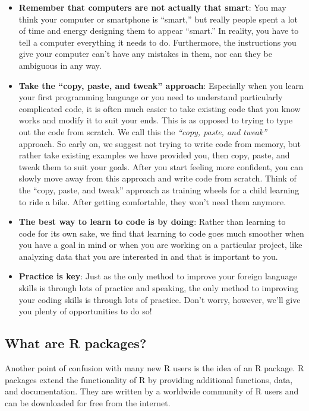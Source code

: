 \documentclass[
]{article}
\providecommand{\tightlist}{%
  \setlength{\itemsep}{0pt}\setlength{\parskip}{0pt}}
\begin{document}
\begin{itemize}
\tightlist
\item
  \textbf{Remember that computers are not actually that smart}: You may
  think your computer or smartphone is ``smart,'' but really people
  spent a lot of time and energy designing them to appear ``smart.'' In
  reality, you have to tell a computer everything it needs to do.
  Furthermore, the instructions you give your computer can't have any
  mistakes in them, nor can they be ambiguous in any way.
\item
  \textbf{Take the ``copy, paste, and tweak'' approach}: Especially when
  you learn your first programming language or you need to understand
  particularly complicated code, it is often much easier to take
  existing code that you know works and modify it to suit your ends.
  This is as opposed to trying to type out the code from scratch. We
  call this the \emph{``copy, paste, and tweak''} approach. So early on,
  we suggest not trying to write code from memory, but rather take
  existing examples we have provided you, then copy, paste, and tweak
  them to suit your goals. After you start feeling more confident, you
  can slowly move away from this approach and write code from scratch.
  Think of the ``copy, paste, and tweak'' approach as training wheels
  for a child learning to ride a bike. After getting comfortable, they
  won't need them anymore.
\item
  \textbf{The best way to learn to code is by doing}: Rather than
  learning to code for its own sake, we find that learning to code goes
  much smoother when you have a goal in mind or when you are working on
  a particular project, like analyzing data that you are interested in
  and that is important to you.
\item
  \textbf{Practice is key}: Just as the only method to improve your
  foreign language skills is through lots of practice and speaking, the
  only method to improving your coding skills is through lots of
  practice. Don't worry, however, we'll give you plenty of opportunities
  to do so!
\end{itemize}

\hypertarget{packages}{%
\subsection{What are R packages?}\label{packages}}

Another point of confusion with many new R users is the idea of an R
package. R packages extend the functionality of R by providing
additional functions, data, and documentation. They are written by a
worldwide community of R users and can be downloaded for free from the
internet.
\end{document}
